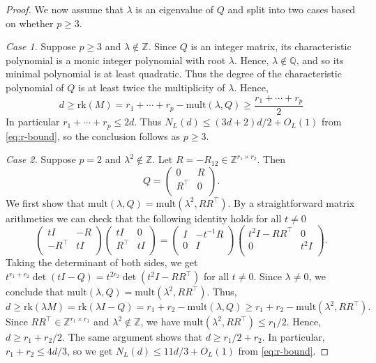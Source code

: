 \documentclass[reqno, 11pt]{amsart}
\theoremstyle{definition}
\theoremstyle{remark}
\newcommand{\paren}[1]{\left( #1 \right)}
\newcommand{\ZZ}{\mathbb{Z}}
\newcommand{\QQ}{\mathbb{Q}}
\begin{document}
\begin{proof}
   We now assume that $\lambda$ is an eigenvalue of $Q$ and split into two cases based on whether $p \geq 3$.

    \textit{Case 1.} Suppose $p \geq 3$ and $\lambda \notin \ZZ$. Since $Q$ is an integer matrix, its characteristic polynomial is a monic integer polynomial with root $\lambda$. Hence, $\lambda \notin \QQ$, and so its minimal polynomial is at least quadratic. Thus the degree of the characteristic polynomial of $Q$ is at least twice the multiplicity of $\lambda$. Hence,
    \[
        d \geq \mathrm{rk}(M) = r_1 + \cdots + r_p - \mathrm{mult} \left(\lambda, Q\right) \geq \frac{r_1 + \cdots + r_p}{2}
    \]
    In particular $r_1 + \cdots + r_p \leq 2d$. Thus $N_L(d) \leq (3d + 2)d/2 + O_L(1)$ from \cref{eq:r-bound}, so the conclusion follows as $p \geq 3$.
    
    \textit{Case 2.} Suppose $p = 2$ and $\lambda^2 \notin \ZZ$. Let $R = -R_{12} \in \ZZ^{r_1 \times r_2}$. Then
    \[
        Q = \begin{pmatrix}
            0 & R \\
            R^\intercal & 0 \\
        \end{pmatrix}.
    \]
    We first show that $\mathrm{mult}(\lambda, Q) = \mathrm{mult}(\lambda^2, RR^\intercal)$. By a straightforward matrix arithmetics we can check that the following identity holds for all $t \neq 0$
    \[
         \begin{pmatrix}
            tI & -R \\
            -R^\intercal & tI \\
        \end{pmatrix} 
        \begin{pmatrix}
            tI & 0 \\
            R^\intercal & tI \\
        \end{pmatrix} 
        =\begin{pmatrix}
            I & -t^{-1}R \\
            0 & I \\
        \end{pmatrix} 
        \begin{pmatrix}
            t^2I - RR^\intercal & 0 \\
            0 & t^2I \\
        \end{pmatrix}.
    \]
    Taking the determinant of both sides, we get $t^{r_1 + r_2}\det \paren{t I - Q} = t^{2r_2}\det \paren{t^2 I - RR^\intercal}$ for all $t \neq 0$. Since $\lambda \neq 0$, we conclude that $\mathrm{mult}(\lambda, Q) = \mathrm{mult}(\lambda^2, RR^\intercal)$. Thus,
    \[
        d \geq \mathrm{rk}(\lambda M) = \mathrm{rk}(\lambda I - Q) = r_1 + r_2 - \mathrm{mult}(\lambda, Q) \geq r_1 + r_2 - \mathrm{mult}(\lambda^2, RR^\intercal).
    \]    
    Since $RR^\intercal \in \ZZ^{r_1 \times r_1}$ and $\lambda^2 \notin \ZZ$, we have $\mathrm{mult}(\lambda^2, RR^\intercal) \leq r_1/2$. Hence, $d \geq r_1 + r_2/2$.
    The same argument shows that $d \geq r_1/2 + r_2$. In particular, $ r_1 + r_2 \leq 4d/3$, so we get $N_L(d) \leq 11d/3 + O_L(1)$ from \cref{eq:r-bound}.
\end{proof}
\end{document}

